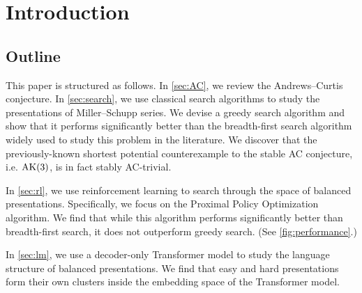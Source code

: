 
\section{Introduction\label{sec:intro}}

\TBW

\subsection*{Outline}




This paper is structured as follows. In \autoref{sec:AC}, we review the Andrews--Curtis conjecture. In \autoref{sec:search}, we use classical search algorithms to study the presentations of Miller--Schupp series. We devise a greedy search algorithm and show that it performs significantly better than the breadth-first search algorithm widely used to study this problem in the literature. We discover that the previously-known shortest potential counterexample to the stable AC conjecture, i.e. $\text{AK}(3)$, is in fact stably AC-trivial.

In \autoref{sec:rl}, we use reinforcement learning to search through the space of balanced presentations. Specifically, we focus on the Proximal Policy Optimization algorithm. We find that while this algorithm performs significantly better than breadth-first search, it does not outperform greedy search. (See \autoref{fig:performance}.)

In \autoref{sec:lm}, we use a decoder-only Transformer model to study the language structure of balanced presentations. We find that easy and hard presentations form their own clusters inside the embedding space of the Transformer model.

